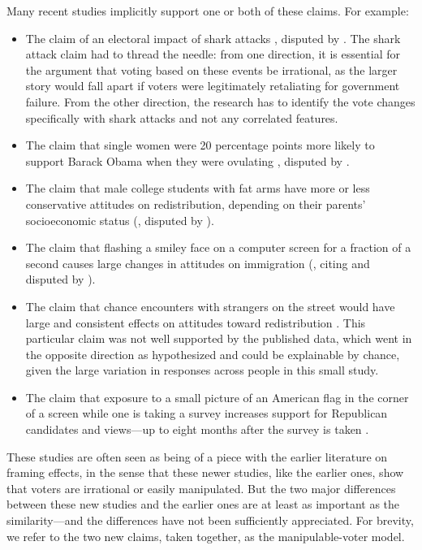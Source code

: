 \documentclass[11pt,letterpaper]{article}
\begin{document}
Many recent studies implicitly support one or both of these claims. For example:
\begin{itemize}
\item The claim of an electoral impact of shark attacks \citep{achen2002},
  disputed by \citet{fowler2018}. The shark attack claim had to thread the
  needle: from one direction, it is essential for the argument that voting based
  on these events be irrational, as the larger story would fall apart if voters
  were legitimately retaliating for government failure. From the other
  direction, the research has to identify the vote changes specifically with
  shark attacks and not any correlated features.
\item The claim that single women were 20 percentage points more likely to
  support Barack Obama when they were ovulating \citep*{durante2013}, disputed
  by \citet{gelman2015b}.
\item The claim that male college students with fat arms have more or less
  conservative attitudes on redistribution, depending on their parents'
  socioeconomic status (\citealt{petersen2013}, disputed by
  \citealt{gelman2014}).
\item The claim that flashing a smiley face on a computer screen for a fraction
  of a second causes large changes in attitudes on immigration
  (\citealt{bartels2014}, citing \citealt*{erisen2014} and disputed by
  \citealt{gelman2015a}).
\item The claim that chance encounters with strangers on the street would have
  large and consistent effects on attitudes toward redistribution
  \citep{sands2017}. This particular claim was not well supported by the
  published data, which went in the opposite direction as hypothesized and could
  be explainable by chance, given the large variation in responses across people
  in this small study.
\item The claim that exposure to a small picture of an American flag in the
  corner of a screen while one is taking a survey increases support for
  Republican candidates and views---up to eight months after the survey is
  taken \citep*{carter2011}.
\end{itemize}

These studies are often seen as being of a piece with the earlier literature on
framing effects, in the sense that these newer studies, like the earlier ones,
show that voters are irrational or easily manipulated. But the two major
differences between these new studies and the earlier ones are at least as
important as the similarity---and the differences have not been sufficiently
appreciated. For brevity, we refer to the two new claims, taken together, as the
manipulable-voter model.
\end{document}
